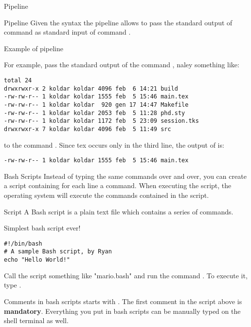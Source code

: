\begin{frame}[fragile]{Pipeline}
	\only<1->
	\begin{block}{Pipeline}
		Given the syntax  the pipeline allows to pass the standard output of command  as standard input of command .
	\end{block}
\end{frame}

\begin{frame}[fragile]{Example of pipeline}

	For example,  pass the standard output of the command , naley something like:
\begin{verbatim}
total 24
drwxrwxr-x 2 koldar koldar 4096 feb  6 14:21 build
-rw-rw-r-- 1 koldar koldar 1555 feb  5 15:46 main.tex
-rw-rw-r-- 1 koldar koldar  920 gen 17 14:47 Makefile
-rw-rw-r-- 1 koldar koldar 2053 feb  5 11:28 phd.sty
-rw-rw-r-- 1 koldar koldar 1172 feb  5 23:09 session.tks
drwxrwxr-x 7 koldar koldar 4096 feb  5 11:49 src
\end{verbatim}
	to the command . Since tex occurs only in the third line, the output of  is:
\begin{verbatim}
-rw-rw-r-- 1 koldar koldar 1555 feb  5 15:46 main.tex
\end{verbatim}
\end{frame}

\begin{frame}{Bash Scripts}
	Instead of typing the same commands over and over, you can create a script containing for each line a command.
	When executing the script, the operating system will execute the commands contained in the script.
	
	\begin{block}{Script}
		A Bash script is a plain text file which contains a series of commands.\cite{bash:script}
	\end{block}
\end{frame}

\begin{frame}[fragile]{Simplest bash script ever!}
\begin{verbatim}
#!/bin/bash
# A sample Bash script, by Ryan
echo "Hello World!"
\end{verbatim}

Call the script\cite{bash:script} something like "mario.bash" and run the command .
To execute it, type .

\begin{note}
Comments in bash scripts starts with \mdQuote{\#}. The first comment in the script above is \textbf{mandatory}.
Everything you put in bash scripts can be manually typed on the shell terminal as well.
\end{note}
\end{frame}

